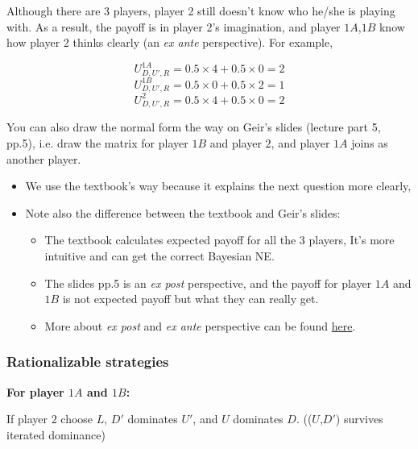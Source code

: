 \documentclass{article}
\begin{document}
\begin{mdframed}[backgroundcolor=blue!20,linecolor=white]
Although there are 3 players, player 2 still doesn't know who he/she is playing with. As a result, the payoff is in player 2's imagination, and player $1A$,$1B$ know how player 2 thinks clearly (an \textit{ex ante} perspective). For example,

$$U^{1A}_{D,U',R} = 0.5 \times 4 + 0.5 \times 0 =2$$
$$U^{1B}_{D,U',R} = 0.5 \times 0 + 0.5 \times 2 =1$$
$$U^{2}_{D,U',R} = 0.5 \times 4 + 0.5 \times 0 =2$$

\medskip

You can also draw the normal form the way on Geir's slides (lecture part 5, pp.5), i.e. draw
the matrix for player $1B$ and player $2$, and player $1A$ joins as another player. 

\begin{itemize}
\item We use the textbook's way because it explains the next question more clearly,
\item Note also the difference between the textbook and Geir's slides:
\begin{itemize}

\item The textbook calculates expected payoff for all the 3 players,  It's more intuitive and can get the correct Bayesian NE.

\item The slides pp.5 is an \textit{ex post} perspective, and the payoff for player $1A$ and $1B$ is not expected payoff but what they can really get. 

\item More about \textit{ex post} and \textit{ex ante} perspective can be found \href{https://www.cs.toronto.edu/~cebly/2534/Notes/CSC2534_Lecture9.pdf}{here}.
\end{itemize}

\end{itemize}

\end{mdframed}

\subsubsection*{Rationalizable strategies}

\vspace{1mm}

\textbf{For player $1A$ and $1B$:}

If player $2$ choose $L$,  $D'$ dominates $U'$, and $U$ dominates $D$. (($U$,$D'$) survives iterated dominance)
\end{document}

